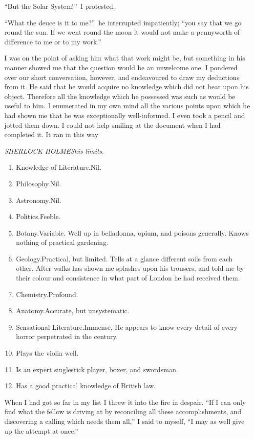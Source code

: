 \documentclass[12pt,english]{book}
\begin{document}
{}``But the Solar System!''\ I protested.

{}``What the deuce is it to me?''\ he interrupted impatiently;
{}``you say that we go round the sun. If we went round the moon it
would not make a pennyworth of difference to me or to my work.''

I was on the point of asking him what that work might be, but something
in his manner showed me that the question would be an unwelcome one.
I pondered over our short conversation, however, and endeavoured to
draw my deductions from it. He said that he would acquire no knowledge
which did not bear upon his object. Therefore all the knowledge which
he possessed was such as would be useful to him. I enumerated in my
own mind all the various points upon which he had shown me that he
was exceptionally well-informed. I even took a pencil and jotted them
down. I could not help smiling at the document when I had completed
it. It ran in this way\mdsh{---}

\bigskip{}
\begin{center}\emph{SHERLOCK HOLMES\mdsh{---}his limits.}\end{center}

\begin{enumerate}
\item Knowledge of Literature.\mdsh{---}Nil.
\item Philosophy.\mdsh{---}Nil.
\item Astronomy.\mdsh{---}Nil.
\item Politics.\mdsh{---}Feeble.
\item Botany.\mdsh{---}Variable. Well up in belladonna, opium, and poisons
generally. Knows nothing of practical gardening.
\item Geology.\mdsh{---}Practical, but limited. Tells at a glance different
soils from each other. After walks has shown me splashes upon his
trousers, and told me by their colour and consistence in what part
of London he had received them.
\item Chemistry.\mdsh{---}Profound. 
\item Anatomy.\mdsh{---}Accurate, but unsystematic. 
\item Sensational Literature.\mdsh{---}Immense. He appears to know every
detail of every horror perpetrated in the century.
\item Plays the violin well.
\item Is an expert singlestick player, boxer, and swordsman. 
\item Has a good practical knowledge of British law.
\end{enumerate}
When I had got so far in my list I threw it into the fire in despair.
{}``If I can only find what the fellow is driving at by reconciling
all these accomplishments, and discovering a calling which needs them
all,'' I said to myself, {}``I may as well give up the attempt at
once.''
\end{document}
